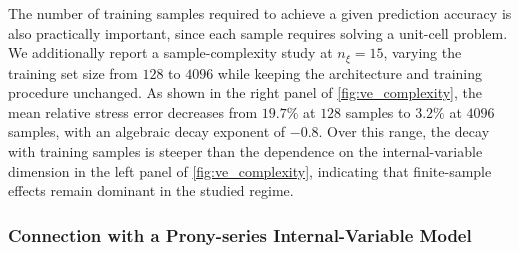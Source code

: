 \documentclass[3p, 12pt, preprint]{elsarticle}
\begin{document}
The number of training samples required to achieve a given prediction accuracy is also practically important, since each sample requires solving a unit-cell problem. We additionally report a sample-complexity study at $n_{\xi}=15$, varying the training set size from $128$ to $4096$ while keeping the architecture and training procedure unchanged. As shown in the right panel of \cref{fig:ve_complexity}, the mean relative stress error decreases from $19.7\%$ at $128$ samples to $3.2\%$ at $4096$ samples, with an algebraic decay exponent of $-0.8$. Over this range, the decay with training samples is steeper than the dependence on the internal-variable dimension in the left panel of \cref{fig:ve_complexity}, indicating that finite-sample effects remain dominant in the studied regime.

\subsubsection{Connection with a Prony-series Internal-Variable Model}\label{sssec:kv2d_prony_diagnostics}
\end{document}

